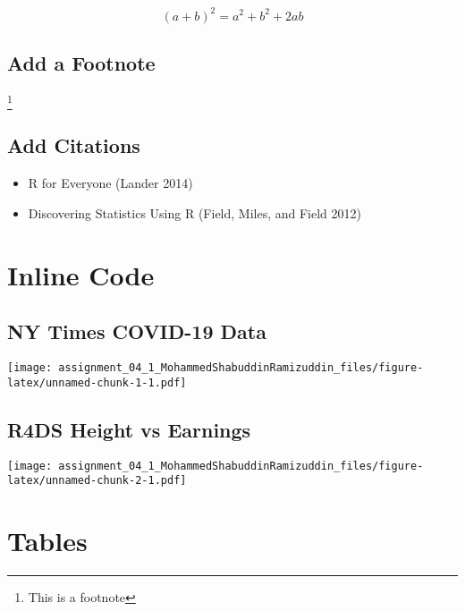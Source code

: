 \documentclass[
]{article}
\providecommand{\tightlist}{%
  \setlength{\itemsep}{0pt}\setlength{\parskip}{0pt}}
\begin{document}
\begin{equation}
  (a+b)^2=a^2+b^2+2ab
  \label{a_plus_b_square}
\end{equation}

\hypertarget{add-a-footnote}{%
\subsection{Add a Footnote}\label{add-a-footnote}}

\footnote{This is a footnote}

\hypertarget{add-citations}{%
\subsection{Add Citations}\label{add-citations}}

\begin{itemize}
\tightlist
\item
  R for Everyone (Lander 2014)
\item
  Discovering Statistics Using R (Field, Miles, and Field 2012)
\end{itemize}

\hypertarget{inline-code}{%
\section{Inline Code}\label{inline-code}}

\hypertarget{ny-times-covid-19-data}{%
\subsection{NY Times COVID-19 Data}\label{ny-times-covid-19-data}}

\texttt{[image: assignment\_04\_1\_MohammedShabuddinRamizuddin\_files/figure-latex/unnamed-chunk-1-1.pdf]}

\hypertarget{r4ds-height-vs-earnings}{%
\subsection{R4DS Height vs Earnings}\label{r4ds-height-vs-earnings}}

\texttt{[image: assignment\_04\_1\_MohammedShabuddinRamizuddin\_files/figure-latex/unnamed-chunk-2-1.pdf]}

\hypertarget{tables}{%
\section{Tables}\label{tables}}
\end{document}
